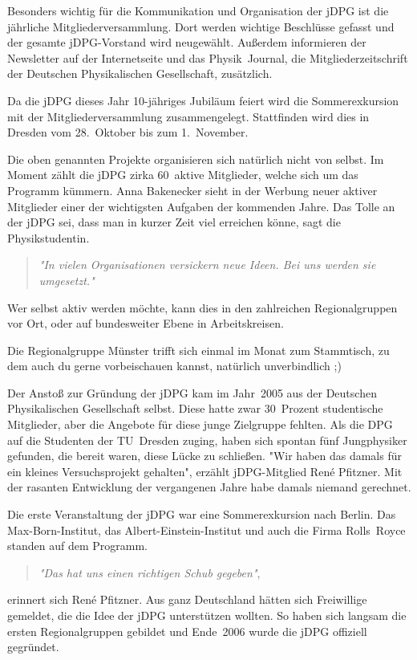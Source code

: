 \begin{multicols}{2}
Besonders wichtig für die Kommunikation und Organisation der jDPG ist die jährliche Mitgliederversammlung.
Dort werden wichtige Beschlüsse gefasst und der gesamte jDPG-Vorstand wird neugewählt.
Außerdem informieren der Newsletter auf der Internetseite und das Physik~Journal, die Mitgliederzeitschrift der Deutschen Physikalischen Gesellschaft, zusätzlich.

Da die jDPG dieses Jahr 10-jähriges Jubiläum feiert wird die Sommerexkursion mit der Mitgliederversammlung zusammengelegt.
Stattfinden wird dies in Dresden vom 28.~Oktober bis zum 1.~November.

Die oben genannten Projekte organisieren sich natürlich nicht von selbst.
Im Moment zählt die jDPG zirka 60~aktive Mitglieder, welche sich um das Programm kümmern.
Anna Bakenecker sieht in der Werbung neuer aktiver Mitglieder einer der wichtigsten Aufgaben der kommenden Jahre.
Das Tolle an der jDPG sei, dass man in kurzer Zeit viel erreichen könne, sagt die Physikstudentin.
\begin{quote}
	\textit{"In vielen Organisationen versickern neue Ideen.
	Bei uns werden sie umgesetzt."}
\end{quote}
Wer selbst aktiv werden möchte, kann dies in den zahlreichen Regionalgruppen vor Ort, oder auf bundesweiter Ebene in Arbeitskreisen.

Die Regionalgruppe Münster trifft sich einmal im Monat zum Stammtisch, zu dem auch du gerne vorbeischauen kannst, natürlich unverbindlich ;)

Der Anstoß zur Gründung der jDPG kam im Jahr~2005 aus der Deutschen Physikalischen Gesellschaft selbst.
Diese hatte zwar 30~Prozent studentische Mitglieder, aber die Angebote für diese junge Zielgruppe fehlten.
Als die DPG auf die Studenten der TU~Dresden zuging, haben sich spontan fünf Jungphysiker gefunden, die bereit waren, diese Lücke zu schließen.
"Wir haben das damals für ein kleines Versuchsprojekt gehalten", erzählt jDPG-Mitglied René Pfitzner.
Mit der rasanten Entwicklung der vergangenen Jahre habe damals niemand gerechnet.

Die erste Veranstaltung der jDPG war eine Sommerexkursion nach Berlin.
Das Max-Born-Institut, das Albert-Einstein-Institut und auch die Firma Rolls~Royce standen auf dem Programm.

\begin{quote}
	\textit{"Das hat uns einen richtigen Schub gegeben"},
\end{quote}
erinnert sich René Pfitzner.
Aus ganz Deutschland hätten sich Freiwillige gemeldet, die die Idee der jDPG unterstützen wollten.
So haben sich langsam die ersten Regionalgruppen gebildet und Ende~2006 wurde die jDPG offiziell gegründet.


\end{multicols}
